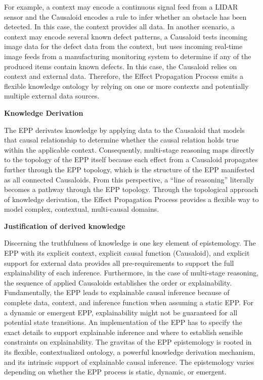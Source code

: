 \documentclass{article}
\begin{document}
For example, a context may encode a continuous signal feed from a LIDAR sensor and the Causaloid encodes a rule to infer whether an obstacle has been detected. In this case, the context provides all data. In another scenario, a context may encode several known defect patterns, a Causaloid tests incoming image data for the defect data from the context, but uses incoming real-time image feeds from a manufacturing monitoring system to determine if any of the produced items contain known defects. In this case, the Causaloid relies on context and external data. Therefore, the Effect Propagation Process emits a flexible knowledge ontology by relying on one or more contexts and potentially multiple external data sources.

\textbf{Knowledge Derivation}

The EPP derivates knowledge by applying data to the Causaloid that models that causal relationship to determine whether the causal relation holds true within the applicable context. Consequently, multi-stage reasoning maps directly to the topology of the EPP itself because each effect from a Causaloid propagates further through the EPP topology, which is the structure of the EPP manifested as all connected Causaloids.
From this perspective, a “line of reasoning” literally becomes a pathway through the EPP topology.
Through the topological approach of knowledge derivation, the Effect Propagation Process provides a flexible way to model complex, contextual, multi-causal domains.

\newpage

\textbf{Justification of derived knowledge}

Discerning the truthfulness of knowledge is one key element of epistemology. The EPP with its explicit context, explicit causal function (Causaloid), and explicit support for external data provides all pre-requirements to support the full explainability of each inference. Furthermore, in the case of multi-stage reasoning, the sequence of applied Causaloids establishes the order or explainability.
Fundamentally, the EPP leads to explainable causal inference because of complete data, context, and inference function when assuming a static EPP. For a dynamic or emergent EPP, explainability might not be guaranteed for all potential state transitions. An implementation of the EPP has to specify the exact details to support explainable inference and where to establish sensible constraints on explainability. The gravitas of the EPP epistemology is rooted in its flexible, contextualized ontology, a powerful knowledge derivation mechanism, and its intrinsic support of explainable causal inference. The epistemology varies depending on whether the EPP process is static, dynamic, or emergent.
\end{document}
